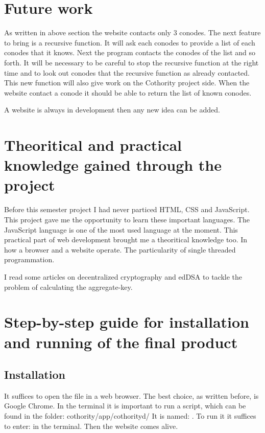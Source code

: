 \documentclass[11pt, a4paper, twoside, openright, openany]{article} %
\begin{document}
\section{Future work}
As written in above section the website contacts only 3 conodes. The next feature
to bring is a recursive function. It will ask each conodes to provide a list of each conodes
that it knows. Next the program contacts the conodes of the list and so forth.
\newline
It will be necessary to be careful to stop the recursive function at the right time and
to look out conodes that the recursive function as already contacted.
\newline
This new function will also give work on the Cothority project side. When the website
contact a conode it should be able to return the list of known conodes.
\bigbreak

A website is always in development then any new idea can be added.
\bigbreak

\section{Theoritical and practical knowledge gained through the project}
Before this semester project I had never particed HTML, CSS and JavaScript. This
project gave me the opportunity to learn these important languages. The JavaScript language is
one of the most used language at the moment.
\newline
This practical part of web development brought me a theoritical knowledge too.
In how a browser and a website operate. The particularity of single threaded programmation.
\newline \newline

I read some articles on decentralized cryptography and edDSA to tackle the problem
of calculating the aggregate-key.
\bigbreak

\section{Step-by-step guide for installation and running of the final product}
\subsection{Installation}
It suffices to open the file  in a web browser. The best choice, as
written before, is Google Chrome.
\newline
In the terminal it is important to run a script, which can be found in the folder: cothority/app/cothorityd/
\newline
It is named: . To run it it suffices to enter:  in the terminal.
\newline \newline
Then the website comes alive.
\bigbreak
\end{document}
